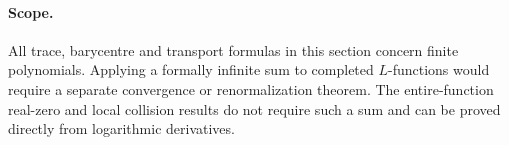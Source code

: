 \paragraph{Scope.}
All trace, barycentre and transport formulas in this section concern
finite polynomials.  Applying a formally infinite sum to completed
$L$-functions would require a separate convergence or renormalization
theorem.  The entire-function real-zero and local collision results
do not require such a sum and can be proved directly from logarithmic
derivatives.
